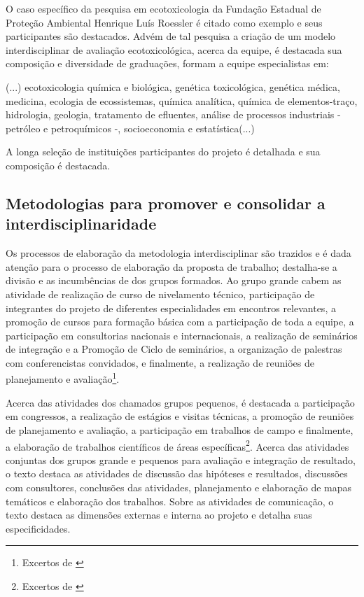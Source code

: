 \documentclass[
   article,       %
   12pt,          %
   oneside,       %
   a4paper,       %
   english,       %
   brazil,           %
   sumario=tradicional
   ]{abntex2}
\begin{document}
O caso específico da pesquisa em ecotoxicologia da Fundação Estadual
de Proteção Ambiental Henrique Luís Roessler é citado como exemplo e seus participantes são destacados. Advém de tal pesquisa a criação de um modelo interdisciplinar de avaliação ecotoxicológica, acerca da equipe, é destacada sua composição e diversidade de graduações, formam a equipe especialistas em:

\begin{citacao}
(...) ecotoxicologia química e biológica, genética toxicológica,
genética médica, medicina, ecologia de ecossistemas, química analítica, química
de elementos-traço, hidrologia, geologia, tratamento de efluentes, análise de
processos industriais - petróleo e petroquímicos -, socioeconomia e estatística(...) \cite[p.159]{Interdisciplinar_casos}
\end{citacao}

A longa seleção de instituições participantes do projeto é detalhada e sua composição é destacada.


\subsection{Metodologias para promover e consolidar a interdisciplinaridade}

Os processos de elaboração da metodologia interdisciplinar são trazidos e é dada atenção para o processo de elaboração da proposta de trabalho; destalha-se a divisão e as incumbências de dos grupos formados. Ao grupo grande cabem as atividade de realização de curso de nivelamento técnico, participação de integrantes do projeto de diferentes especialidades em encontros relevantes, a promoção de cursos para formação básica com a participação de toda a equipe, a participação em consultorias nacionais e internacionais, a realização de seminários de integração e a Promoção de Ciclo de seminários, a organização de palestras com conferencistas convidados, e finalmente, a realização de reuniões de planejamento e avaliação\footnote{Excertos de \cite[p.163-164]{Interdisciplinar_casos}}.

Acerca das atividades dos chamados grupos pequenos, é destacada a participação em congressos, a realização de estágios e visitas técnicas, a promoção de reuniões de planejamento e avaliação, a participação em trabalhos de campo e finalmente, a elaboração de trabalhos científicos de áreas específicas\footnote{Excertos de \cite[p.164]{Interdisciplinar_casos}}. Acerca das atividades conjuntas dos grupos grande e pequenos para avaliação e integração de resultado, o texto destaca as atividades de discussão das hipóteses e resultados, discussões com consultores, conclusões das atividades, planejamento e elaboração de mapas temáticos e elaboração dos trabalhos. Sobre as atividades de comunicação, o texto destaca as dimensões externas e interna ao projeto e detalha suas especificidades.
\end{document}
